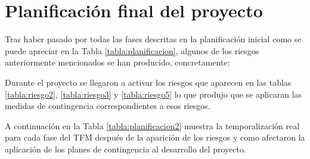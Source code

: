 \section{Planificación final del proyecto}
Tras haber pasado por todas las fases descritas en la planificación inicial como se puede apreciar en la Tabla \ref{tabla:planificacion}, algunos de los riesgos anteriormente mencionados se han producido, concretamente:

Durante el proyecto se llegaron a activar los riesgos que aparecen en las tablas \ref{tabla:riesgo2}, \ref{tabla:riesgo3} y \ref{tabla:riesgo5} lo que produjo que se aplicaran las medidas de contingencia correspondientes a esos riesgos.

A continuación en la Tabla \ref{tabla:planificacion2} muestra la temporalización real para cada fase del TFM después de la aparición de los riesgos y como afectaron la aplicación de los planes de contingencia al desarrollo del proyecto.

